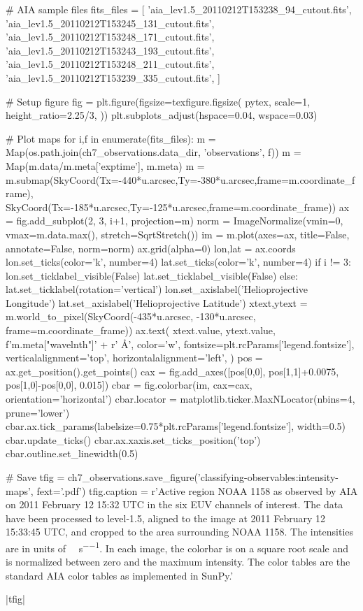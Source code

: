 \begin{pycode}
# AIA sample files
fits_files = [
    'aia_lev1.5_20110212T153238_94_cutout.fits',
    'aia_lev1.5_20110212T153245_131_cutout.fits',
    'aia_lev1.5_20110212T153248_171_cutout.fits',
    'aia_lev1.5_20110212T153243_193_cutout.fits',
    'aia_lev1.5_20110212T153248_211_cutout.fits',
    'aia_lev1.5_20110212T153239_335_cutout.fits',
]

# Setup figure
fig = plt.figure(figsize=texfigure.figsize(
    pytex,
    scale=1,
    height_ratio=2.25/3,
))
plt.subplots_adjust(hspace=0.04, wspace=0.03)

# Plot maps
for i,f in enumerate(fits_files):
    m = Map(os.path.join(ch7_observations.data_dir, 'observations', f))
    m = Map(m.data/m.meta['exptime'], m.meta)
    m = m.submap(SkyCoord(Tx=-440*u.arcsec,Ty=-380*u.arcsec,frame=m.coordinate_frame),
                 SkyCoord(Tx=-185*u.arcsec,Ty=-125*u.arcsec,frame=m.coordinate_frame))
    ax = fig.add_subplot(2, 3, i+1, projection=m)
    norm = ImageNormalize(vmin=0, vmax=m.data.max(), stretch=SqrtStretch())
    im = m.plot(axes=ax, title=False, annotate=False, norm=norm)
    ax.grid(alpha=0)
    lon,lat = ax.coords
    lon.set_ticks(color='k', number=4)
    lat.set_ticks(color='k', number=4)
    if i != 3:
        lon.set_ticklabel_visible(False)
        lat.set_ticklabel_visible(False)
    else:
        lat.set_ticklabel(rotation='vertical')
        lon.set_axislabel('Helioprojective Longitude')
        lat.set_axislabel('Helioprojective Latitude')
    xtext,ytext = m.world_to_pixel(SkyCoord(-435*u.arcsec, -130*u.arcsec, frame=m.coordinate_frame))
    ax.text(
        xtext.value, ytext.value,
        f'{m.meta["wavelnth"]}' + r' \si{\angstrom}',
        color='w',
        fontsize=plt.rcParams['legend.fontsize'],
        verticalalignment='top',
        horizontalalignment='left',
    )
    pos = ax.get_position().get_points()
    cax = fig.add_axes([pos[0,0], pos[1,1]+0.0075, pos[1,0]-pos[0,0], 0.015])
    cbar = fig.colorbar(im, cax=cax, orientation='horizontal')
    cbar.locator = matplotlib.ticker.MaxNLocator(nbins=4, prune='lower')
    cbar.ax.tick_params(labelsize=0.75*plt.rcParams['legend.fontsize'], width=0.5)
    cbar.update_ticks()
    cbar.ax.xaxis.set_ticks_position('top')
    cbar.outline.set_linewidth(0.5)

# Save
tfig = ch7_observations.save_figure('classifying-observables:intensity-maps', fext='.pdf')
tfig.caption = r'Active region NOAA 1158 as observed by AIA on 2011 February 12 15:32 UTC in the six EUV channels of interest. The data have been processed to level-1.5, aligned to the image at 2011 February 12 15:33:45 UTC, and cropped to the area surrounding NOAA 1158. The intensities are in units of \si{\dn\per\pixel\per\second}. In each image, the colorbar is on a square root scale and is normalized between zero and the maximum intensity. The color tables are the standard AIA color tables as implemented in SunPy.'
\end{pycode}
|tfig|

